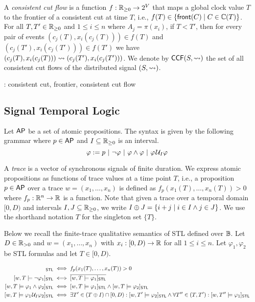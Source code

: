 A \emph{consistent cut flow} is a function $f : \mathbb{R}_{\geq 0} \to 2^V$ that maps a global clock value $T$ to the frontier of a consistent cut at time $T$, i.e., $f(T) \in \{\fr(C) \st C \in \CC(T)\}$.
For all $T,T' \in \mathbb{R}_{\geq 0}$ and $1 \leq i \leq n$ where $A_j = \pi(x_i)$, if $T < T'$, then for every pair of events $(c_j(T), x_i(c_j(T))) \in f(T)$ and $(c_j(T'), x_i(c_j(T'))) \in f(T')$ we have $(c_j(T), x_i(c_j(T))) \rightsquigarrow (c_j(T'), x_i(c_j(T')))$.
We denote by $\mathsf{CCF}(S,{\rightsquigarrow})$ the set of all consistent cut flows of the distributed signal $(S,{\rightsquigarrow})$.

\begin{example}
	\TODO: consistent cut, frontier, consistent cut flow
\end{example}


\subsection{Signal Temporal Logic} \label{sec:stl}
Let $\mathsf{AP}$ be a set of atomic propositions.
The syntax is given by the following grammar where $p \in \mathsf{AP}$ and $I \subseteq \mathbb{R}_{\geq 0}$ is an interval.
$$ \varphi :=  p ~|~ \lnot \varphi ~|~ \varphi \land \varphi ~|~ \varphi \kern.1em\mathcal{U}_I \varphi$$

A \emph{trace} is a vector of synchronous signals of finite duration.
We express atomic propositions as functions of trace values at a time point $T$, i.e., a proposition $p \in \mathsf{AP}$ over a trace $w = (x_1, \ldots, x_n)$ is defined as $f_p(x_1(T), \ldots, x_n(T)) > 0$ where $f_p : \mathbb{R}^n \to \mathbb{R}$ is a function.
Note that given a trace over a temporal domain $[0,D)$ and intervals $I,J \subseteq \mathbb{R}_{\geq 0}$, we write $I \oplus J = \{i + j \st i \in I \land j \in J\}$.
We use the shorthand notation $T$ for the singleton set $\{T\}$.

Below we recall the finite-trace qualitative semantics of STL defined over $\mathbb{B}$.
Let $D \in \mathbb{R}_{> 0}$ and $w = (x_1, \ldots, x_n)$ with $x_i : [0,D) \to \mathbb{R}$ for all $1 \leq i \leq n$.
Let $\varphi_1, \varphi_2$ be STL formulas and let $T \in [0,D)$.

\small
\begin{align*}
	[w,T \models p]_{\mathsf{STL}} &\iff f_p(x_1(T), \ldots, x_n(T)) > 0 \\
	[w,T \models \lnot \varphi_1]_{\mathsf{STL}} &\iff \overline{[w,T \models \varphi_1]_{\mathsf{STL}}} \\
	[w,T \models \varphi_1 \land \varphi_2]_{\mathsf{STL}} &\iff [w,T \models \varphi_1]_{\mathsf{STL}} \land [w,T \models \varphi_2]_{\mathsf{STL}} \\
	[w,T \models \varphi_1 \until_I \varphi_2]_{\mathsf{STL}} &\iff \exists T' \in (T \oplus I) \cap [0,D) : [w,T' \models \varphi_2]_{\mathsf{STL}} \land \forall T'' \in (T, T') : [w,T'' \models \varphi_1]_{\mathsf{STL}} \\
\end{align*}
\normalsize

